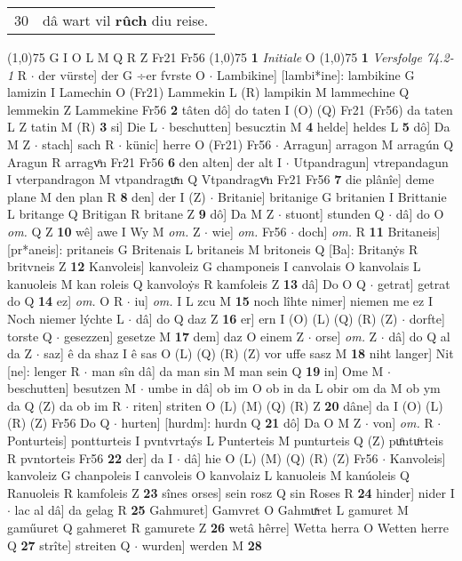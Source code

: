 \documentclass[8pt,a4paper,notitlepage]{article}
\begin{document}
\begin{table}[ht]
\begin{minipage}[t]{0.5\linewidth}
\begin{tabular}{rl}
30 & dâ wart vil \textbf{rûch} diu reise.\\ 
\end{tabular}
\scriptsize
\line(1,0){75} \newline
G I O L M Q R Z Fr21 Fr56 \newline
\line(1,0){75} \newline
\textbf{1} \textit{Initiale} O  \newline
\line(1,0){75} \newline
\textbf{1} \textit{Versfolge 74.2-1} R   $\cdot$ der vürste] der G ÷er fvrste O  $\cdot$ Lambikine] [lambi*ine]: lambikine G lamizin I Lamechin O (Fr21) Lammekin L (R) lampikin M lammechine Q lemmekin Z Lammekine Fr56 \textbf{2} tâten dô] do taten I (O) (Q) Fr21 (Fr56) da taten L Z tatin M (R) \textbf{3} si] Die L  $\cdot$ beschutten] besucztin M \textbf{4} helde] heldes L \textbf{5} dô] Da M Z  $\cdot$ stach] sach R  $\cdot$ künic] herre O (Fr21) Fr56  $\cdot$ Arragun] arragon M arragún Q Aragun R arragvͦn Fr21 Fr56 \textbf{6} den alten] der alt I  $\cdot$ Utpandragun] vtrepandagun I vterpandragon M vtpandraguͯn Q Vtpandragvͦn Fr21 Fr56 \textbf{7} die plânîe] deme plane M den plan R \textbf{8} den] der I (Z)  $\cdot$ Britanie] britanige G britanien I Brittanie L britange Q Britigan R britane Z \textbf{9} dô] Da M Z  $\cdot$ stuont] stunden Q  $\cdot$ dâ] do O \textit{om.} Q Z \textbf{10} wê] awe I Wy M \textit{om.} Z  $\cdot$ wie] \textit{om.} Fr56  $\cdot$ doch] \textit{om.} R \textbf{11} Britaneis] [pr*aneis]: pritaneis G Britenais L britaneis M britoneis Q [Ba]: Britanẏs R britvneis Z \textbf{12} Kanvoleis] kanvoleiz G champoneis I canvolais O kanvolais L kanuoleis M kan roleis Q kanvoloẏs R kamfoleis Z \textbf{13} dâ] Do O Q  $\cdot$ getrat] getrat do Q \textbf{14} ez] \textit{om.} O R  $\cdot$ iu] \textit{om.} I L zcu M \textbf{15} noch lîhte nimer] niemen me ez I Noch niemer lýchte L  $\cdot$ dâ] do Q daz Z \textbf{16} er] ern I (O) (L) (Q) (R) (Z)  $\cdot$ dorfte] torste Q  $\cdot$ gesezzen] gesetze M \textbf{17} dem] daz O einem Z  $\cdot$ orse] \textit{om.} Z  $\cdot$ dâ] do Q al da Z  $\cdot$ saz] ê da shaz I ê sas O (L) (Q) (R) (Z) vor uffe sasz M \textbf{18} niht langer] Nit [ne]: lenger R  $\cdot$ man sîn dâ] da man sin M man sein Q \textbf{19} in] Ome M  $\cdot$ beschutten] besutzen M  $\cdot$ umbe in dâ] ob im O ob in da L obir om da M ob ym da Q (Z) da ob im R  $\cdot$ riten] striten O (L) (M) (Q) (R) Z \textbf{20} dâne] da I (O) (L) (R) (Z) Fr56 Do Q  $\cdot$ hurten] [hurdm]: hurdn Q \textbf{21} dô] Da O M Z  $\cdot$ von] \textit{om.} R  $\cdot$ Ponturteis] pontturteis I pvntvrtaýs L Punterteis M punturteis Q (Z) puͦntuͦrteis R pvntorteis Fr56 \textbf{22} der] da I  $\cdot$ dâ] hie O (L) (M) (Q) (R) (Z) Fr56  $\cdot$ Kanvoleis] kanvoleiz G chanpoleis I canvoleis O kanvolaiz L kanuoleis M kanúoleis Q Ranuoleis R kamfoleis Z \textbf{23} sînes orses] sein rosz Q sin Roses R \textbf{24} hinder] nider I  $\cdot$ lac al dâ] da gelag R \textbf{25} Gahmuret] Gamvret O Gahmuͯret L gamuret M gaműuret Q gahmeret R gamurete Z \textbf{26} wetâ hêrre] Wetta herra O Wetten herre Q \textbf{27} strîte] streiten Q  $\cdot$ wurden] werden M \textbf{28} 
\end{minipage}
\end{table}
\end{document}
